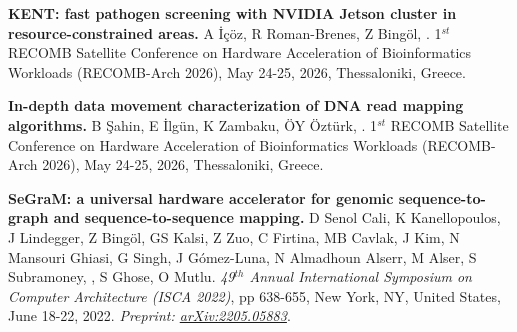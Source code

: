 


\textbf{KENT: fast pathogen screening with NVIDIA Jetson cluster in resource-constrained areas.} A İçöz, R Roman-Brenes, Z Bingöl, \calkan{}. 1$^{st}$ RECOMB Satellite Conference on Hardware Acceleration of Bioinformatics Workloads (RECOMB-Arch 2026), May 24-25, 2026, Thessaloniki, Greece. 

\textbf{In-depth data movement characterization of DNA read mapping algorithms.} B Şahin, E İlgün, K Zambaku, ÖY Öztürk, \calkan{}. 1$^{st}$ RECOMB Satellite Conference on Hardware Acceleration of Bioinformatics Workloads (RECOMB-Arch 2026), May 24-25, 2026, Thessaloniki, Greece.


\vspace{-.2cm}
    {\bf SeGraM: a universal hardware accelerator for genomic sequence-to-graph and sequence-to-sequence mapping.}
    D Senol Cali, K Kanellopoulos, J Lindegger, Z Bingöl, GS Kalsi, Z Zuo, C Firtina, MB Cavlak, J Kim, N Mansouri Ghiasi, G Singh, J Gómez-Luna, N Almadhoun Alserr, M Alser, S Subramoney, \calkan{}, S Ghose, O Mutlu.
    {\em 49$^{th}$ Annual International Symposium on Computer Architecture (ISCA 2022)}, pp 638-655, New York, NY, United States, June 18-22, 2022.
    \textit{Preprint: \href{https://doi.org/10.48550/arXiv.2205.05883}{arXiv:2205.05883}}.



